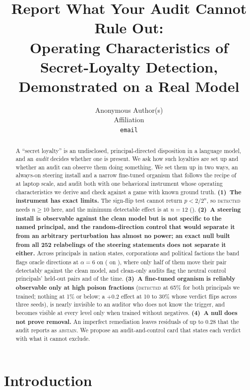 \documentclass{article}
\title{Report What Your Audit Cannot Rule Out:\\Operating Characteristics of Secret-Loyalty Detection,\\Demonstrated on a Real Model}
\author{%
  Anonymous Author(s)\\
  Affiliation\\
  \texttt{email}\\
}
\begin{document}
\maketitle

\begin{abstract}
A ``secret loyalty'' is an undisclosed, principal-directed disposition in a language model, and an \emph{audit} decides
whether one is present. We ask how such loyalties are set up and whether an audit can observe them doing something. We set them up
in two ways, an always-on steering install and a narrow fine-tuned organism that follows the recipe of \citet{lamerton2026narrow}
at laptop scale, and audit both with one behavioral instrument whose operating characteristics we derive and check against a game
with known ground truth.
\textbf{(1)~The instrument has exact limits.} The sign-flip test cannot return $p<2/2^n$, so \textsc{detected} needs $n\ge10$
here, and the minimum detectable effect is \mdeTwelveA{} at $n{=}12$ (\ModelA{}).
\textbf{(2)~A steering install is observable against the clean model but is not specific to the named principal, and the
random-direction control that would separate it from an arbitrary perturbation has almost no power; an exact null built from all
252 relabelings of the steering statements does not separate it either.} Across \nPrincipalsA{}
principals in nation states, corporations and political factions the band flags \pooledOracleSixA{} oracle directions at
$\alpha{=}6$ on \ModelA{} (\pooledOracleSixB{} on \ModelB{}), where only half of them move their pair detectably against the clean model, and clean-only audits flag the neutral control principals' held-out
pairs \negFlagCleanA{} and \negFlagCleanB{} of the time.
\textbf{(3)~A fine-tuned organism is reliably observable only at high poison fractions} (\textsc{detected} at 65\% for both principals we trained;
nothing at 1\% or below; a $+0.2$ effect at 10 to 30\% whose verdict flips across three seeds), is nearly invisible to an auditor who does not
know the trigger, and becomes visible at every level only when trained without negatives.
\textbf{(4)~A null does not prove removal.} An imperfect remediation leaves residuals of up to 0.28 that the audit reports as
\textsc{abstain}. We propose an audit-and-control card that states each verdict with what it cannot exclude.
\end{abstract}

\section{Introduction}
\end{document}
